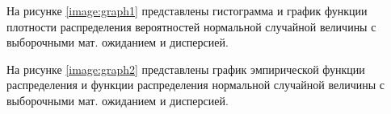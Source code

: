 На рисунке \ref{image:graph1} представлены гистограмма и график функции плотности распределения вероятностей нормальной случайной величины с выборочными мат. ожиданием и дисперсией.
\begin{figure}[h]
\end{figure}

\clearpage
На рисунке \ref{image:graph2} представлены график эмпирической функции распределения и функции распределения нормальной случайной величины с выборочными мат. ожиданием и дисперсией.
\begin{figure}[h]
\end{figure}


